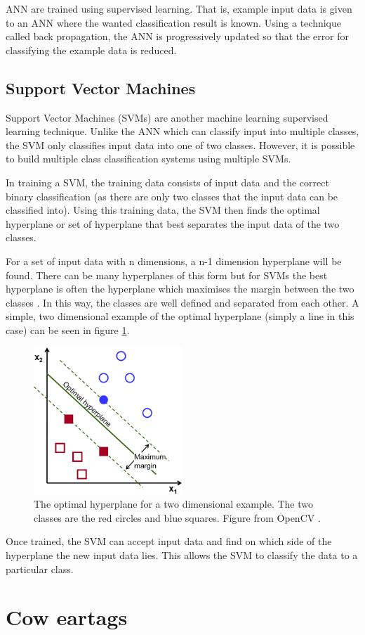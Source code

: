 ANN are trained using supervised learning. That is, example input data is given to an ANN where the wanted classification result is known. Using a technique called back propagation, the ANN is progressively updated so that the error for classifying the example data is reduced.  


\subsection{Support Vector Machines}
\label{SVMAppendix}

Support Vector Machines (SVMs) are another machine learning supervised learning technique. Unlike the ANN which can classify input into multiple classes, the SVM only classifies input data into one of two classes. However, it is possible to build  multiple class classification systems using multiple SVMs. 

In training a SVM, the training data consists of input data and the correct binary classification (as there are only two classes that the input data can be classified into).  Using this training data, the SVM then finds the optimal hyperplane or set of hyperplane that best separates the input data of the two classes.  \cite{Jordan2008}

For a set of input data with n dimensions, a n-1 dimension hyperplane will be found. There can be many hyperplanes of this form but for SVMs the best hyperplane is often the hyperplane which maximises the margin between the two classes \cite{Jordan2008}. In this way, the classes are well defined and separated from each other. A simple, two dimensional example of the optimal hyperplane (simply a line in this case) can be seen in figure \ref{SVM}.

\begin{figure}[ht!]
\begin{center}
\leavevmode
\includegraphics[width=0.5\textwidth]{images/svm.png}
\end{center}
\caption[Example Support Vector Machine]{The optimal hyperplane for a two dimensional example. The two classes are the red circles and blue squares. Figure from OpenCV \cite{SVM}.}
\label{SVM}
\end{figure}

Once trained, the SVM can accept input data and find on which side of the hyperplane the new input data lies. This allows the SVM to classify the data to a particular class. 
\section{Cow eartags}

